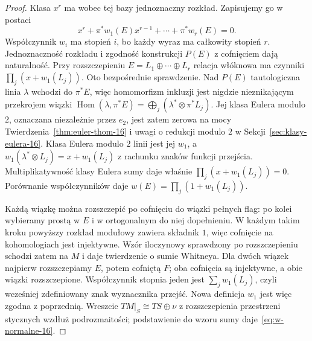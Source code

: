 \documentclass[11pt,a4paper,oneside]{report}
\theoremstyle{plain}
\theoremstyle{definition}
\theoremstyle{remark}
\begin{document}
\begin{proof}
Klasa $x^r$ ma wobec
tej bazy jednoznaczny
rozkład. Zapisujemy
go w postaci
\[
 x^r+
   \pi^*w_1(E)x^{r-1}
     +\cdots+\pi^*w_r(E)=0.
\]
Współczynnik $w_i$
ma stopień $i$,
bo każdy wyraz ma
całkowity stopień $r$.
Jednoznaczność rozkładu
i zgodność konstrukcji
$P(E)$ z cofnięciem
dają naturalność.
Przy rozszczepieniu
$E=L_1\oplus\cdots\oplus L_r$
relacja włóknowa
ma czynniki
$\prod_j(x+w_1(L_j))$.
Oto bezpośrednie
sprawdzenie. Nad $P(E)$
tautologiczna linia
$\lambda$ wchodzi
do $\pi^*E$, więc
homomorfizm inkluzji
jest nigdzie
nieznikającym
przekrojem wiązki
$\operatorname{Hom}(\lambda,\pi^*E)
=\bigoplus_j(\lambda^*\otimes\pi^*L_j)$.
Jej klasa Eulera modulo $2$, oznaczana niezależnie
przez $e_2$, jest zatem zerowa
na mocy
Twierdzenia~\ref{thm:euler-thom-16}
i uwagi o redukcji
modulo $2$ w
Sekcji~\ref{sec:klasy-eulera-16}.
Klasa Eulera modulo $2$
linii jest jej
$w_1$, a
$w_1(\lambda^*\otimes L_j)
=x+w_1(L_j)$
z rachunku znaków
funkcji przejścia.
Multiplikatywność
klasy Eulera sumy
daje właśnie
$\prod_j(x+w_1(L_j))=0$.
Porównanie współczynników
daje
$w(E)=\prod_j(1+w_1(L_j))$.

Każdą wiązkę można
rozszczepić po cofnięciu
do wiązki pełnych flag:
po kolei wybieramy
prostą w $E$ i w
ortogonalnym do niej
dopełnieniu. W każdym
takim kroku powyższy
rozkład modułowy
zawiera składnik $1$,
więc cofnięcie
na kohomologiach
jest injektywne.
Wzór iloczynowy
sprawdzony po
rozszczepieniu
schodzi zatem na $M$
i daje twierdzenie o sumie Whitneya. Dla dwóch
wiązek najpierw rozszczepiamy $E$, potem cofniętą $F$;
oba cofnięcia są injektywne, a obie wiązki rozszczepione.
Współczynnik stopnia jeden jest $\sum_jw_1(L_j)$,
czyli wcześniej zdefiniowany znak wyznacznika przejść.
Nowa definicja $w_1$ jest więc zgodna z poprzednią.
Wreszcie
$TM|_S\cong TS\oplus\nu$
z rozszczepienia przestrzeni stycznych wzdłuż podrozmaitości;
podstawienie do wzoru
sumy daje~\eqref{eq:w-normalne-16}.
\end{proof}
\end{document}
